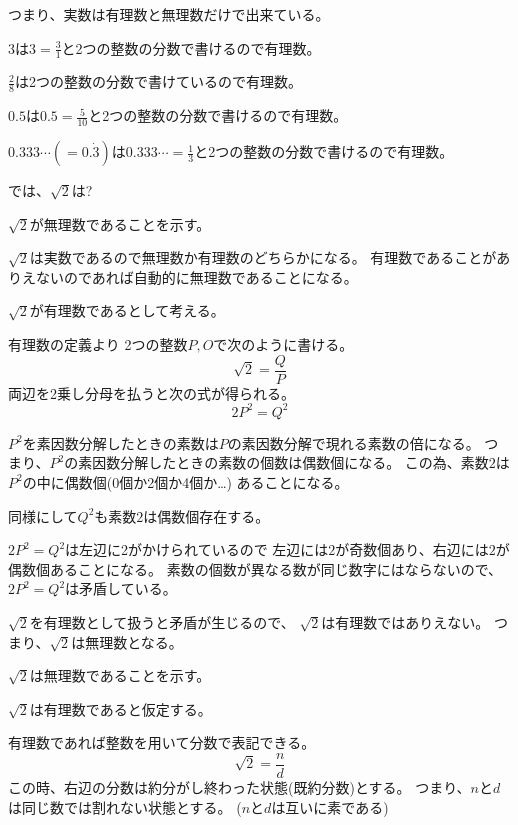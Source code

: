 \documentclass[12pt,b5paper]{ltjsarticle}
\begin{document}
つまり、実数は有理数と無理数だけで出来ている。

\dotfill

$3$は$3=\frac{3}{1}$と2つの整数の分数で書けるので有理数。

$\frac{2}{8}$は2つの整数の分数で書けているので有理数。

$0.5$は$0.5=\frac{5}{10}$と2つの整数の分数で書けるので有理数。

$0.333\cdots(=0.\dot{3})$は$0.333\cdots = \frac{1}{3}$と2つの整数の分数で書けるので有理数。

では、$\sqrt{2}$は?


\hrulefill

$\sqrt{2}$が無理数であることを示す。

$\sqrt{2}$は実数であるので無理数か有理数のどちらかになる。
有理数であることがありえないのであれば自動的に無理数であることになる。

$\sqrt{2}$が有理数であるとして考える。

有理数の定義より
2つの整数$P,O$で次のように書ける。
\begin{equation}
 \sqrt{2}=\frac{Q}{P}
\end{equation}
両辺を2乗し分母を払うと次の式が得られる。
\begin{equation}
 2P^2 = Q^2
\end{equation}

$P^2$を素因数分解したときの素数は$P$の素因数分解で現れる素数の倍になる。
つまり、$P^2$の素因数分解したときの素数の個数は偶数個になる。
この為、素数$2$は$P^2$の中に偶数個(0個か2個か4個か…)
あることになる。

同様にして$Q^2$も素数$2$は偶数個存在する。

$2P^2=Q^2$は左辺に2がかけられているので
左辺には$2$が奇数個あり、右辺には$2$が偶数個あることになる。
素数の個数が異なる数が同じ数字にはならないので、
$2P^2=Q^2$は矛盾している。

$\sqrt{2}$を有理数として扱うと矛盾が生じるので、
$\sqrt{2}$は有理数ではありえない。
つまり、$\sqrt{2}$は無理数となる。


\hrulefill

\hrulefill


$\sqrt{2}$は無理数であることを示す。

$\sqrt{2}$は有理数であると仮定する。

有理数であれば整数を用いて分数で表記できる。
\begin{equation}
 \sqrt{2}=\frac{n}{d}
\end{equation}
この時、右辺の分数は約分がし終わった状態(既約分数)とする。
つまり、$n$と$d$は同じ数では割れない状態とする。
($n$と$d$は互いに素である)
\end{document}
